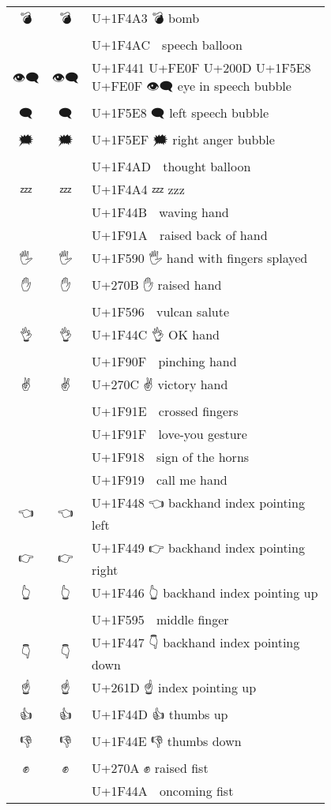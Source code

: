 \documentclass[a4paper,12pt]{article}
\newcommand{\fontA}[1]{{\fontspec[RawFeature={mode=harf,+dist,+ccmp}]{Segoe UI Emoji} #1}}
\newcommand{\fontB}[1]{{\fontspec[RawFeature={mode=harf,+dist,+ccmp}]{Noto Color Emoji} #1}}
\begin{document}
\begin{longtable}[c]{ccp{0.8\linewidth}}
\fontA{💣}&\fontB{💣}&U+1F4A3 💣 bomb\\
\fontA{💬}&\fontB{💬}&U+1F4AC 💬 speech balloon\\
\fontA{👁️‍🗨️}&\fontB{👁️‍🗨️}&U+1F441 U+FE0F U+200D U+1F5E8 U+FE0F 👁️‍🗨️ eye in speech bubble\\
\fontA{🗨}&\fontB{🗨}&U+1F5E8 🗨 left speech bubble\\
\fontA{🗯}&\fontB{🗯}&U+1F5EF 🗯 right anger bubble\\
\fontA{💭}&\fontB{💭}&U+1F4AD 💭 thought balloon\\
\fontA{💤}&\fontB{💤}&U+1F4A4 💤 zzz\\
\fontA{👋}&\fontB{👋}&U+1F44B 👋 waving hand\\
\fontA{🤚}&\fontB{🤚}&U+1F91A 🤚 raised back of hand\\
\fontA{🖐}&\fontB{🖐}&U+1F590 🖐 hand with fingers splayed\\
\fontA{✋}&\fontB{✋}&U+270B ✋ raised hand\\
\fontA{🖖}&\fontB{🖖}&U+1F596 🖖 vulcan salute\\
\fontA{👌}&\fontB{👌}&U+1F44C 👌 OK hand\\
\fontA{🤏}&\fontB{🤏}&U+1F90F 🤏 pinching hand\\
\fontA{✌}&\fontB{✌}&U+270C ✌ victory hand\\
\fontA{🤞}&\fontB{🤞}&U+1F91E 🤞 crossed fingers\\
\fontA{🤟}&\fontB{🤟}&U+1F91F 🤟 love-you gesture\\
\fontA{🤘}&\fontB{🤘}&U+1F918 🤘 sign of the horns\\
\fontA{🤙}&\fontB{🤙}&U+1F919 🤙 call me hand\\
\fontA{👈}&\fontB{👈}&U+1F448 👈 backhand index pointing left\\
\fontA{👉}&\fontB{👉}&U+1F449 👉 backhand index pointing right\\
\fontA{👆}&\fontB{👆}&U+1F446 👆 backhand index pointing up\\
\fontA{🖕}&\fontB{🖕}&U+1F595 🖕 middle finger\\
\fontA{👇}&\fontB{👇}&U+1F447 👇 backhand index pointing down\\
\fontA{☝}&\fontB{☝}&U+261D ☝ index pointing up\\
\fontA{👍}&\fontB{👍}&U+1F44D 👍 thumbs up\\
\fontA{👎}&\fontB{👎}&U+1F44E 👎 thumbs down\\
\fontA{✊}&\fontB{✊}&U+270A ✊ raised fist\\
\fontA{👊}&\fontB{👊}&U+1F44A 👊 oncoming fist\\

\end{longtable}
\end{document}
